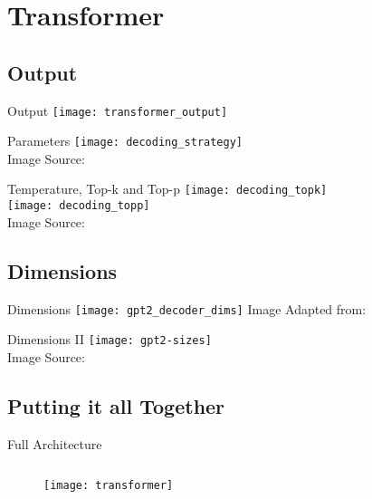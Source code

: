 \section{Transformer}

\subsection{Output}
\begin{frame}[c]{Output}
    \texttt{[image: transformer\_output]}
\end{frame}

\begin{frame}[c]{Parameters}
    \texttt{[image: decoding\_strategy]} \\
    Image Source: \cite{cohereaidocs_topk_2022}
\end{frame}


\begin{frame}[c]{Temperature, Top-k and Top-p}
    \texttt{[image: decoding\_topk]} \\
    \texttt{[image: decoding\_topp]} \\
    Image Source: \cite{cohereaidocs_topk_2022}
\end{frame}

\subsection{Dimensions}
\begin{frame}[c]{Dimensions}
    \texttt{[image: gpt2\_decoder\_dims]}
    Image Adapted from: \cite{gpt_2023}
\end{frame}

\begin{frame}[c]{Dimensions II}
    \texttt{[image: gpt2-sizes]} \\
    Image Source: \cite{alammar_illustrated_2019}
\end{frame}


\subsection{Putting it all Together}
\begin{frame}[c]{Full Architecture}
    \begin{figure}
        \begin{columns}
            \texttt{[image: transformer]}
        \end{columns}
    \end{figure}
\end{frame}

